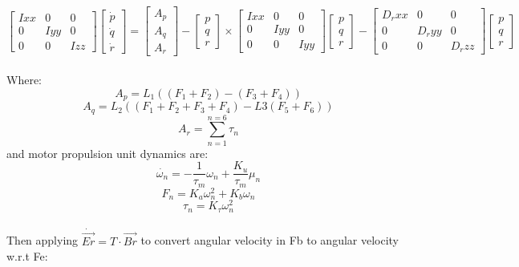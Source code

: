 \documentclass[12pt,a4paper,twoside]{report}
\begin{document}
			$$ 
				\begin{bmatrix}
				Ixx & 0 & 0 \\
				0 & Iyy & 0 \\
				0 & 0 & Izz
				\end{bmatrix}
				\begin{bmatrix}
				\dot{p} \\
				\dot{q} \\
				\dot{r}
				\end{bmatrix}
				=
				\begin{bmatrix}
				A_p \\
				A_q \\
				A_r
				\end{bmatrix}
				-
				\begin{bmatrix}
				p \\
				q \\
				r 
				\end{bmatrix}
				\times
				\begin{bmatrix}
				Ixx & 0 & 0 \\
				0 & Iyy & 0 \\
				0 & 0 & Iyy
				\end{bmatrix}
				\begin{bmatrix}
				p \\
				q \\
				r 
				\end{bmatrix}
				-
				\begin{bmatrix}
				D_rxx & 0 & 0 \\
				0 & D_ryy & 0 \\
				0 & 0 & D_rzz
				\end{bmatrix}
				\begin{bmatrix}
				p \\
				q \\
				r
				\end{bmatrix}
			$$ 
			\\
			Where:
				\[ A_p = L_1 ((F_1+F_2) - (F_3+F_4)) \]
				\[ A_q = L_2 ((F_1+F_2+F_3+F_4) - L3 (F_5+F_6)) \]
				\[ A_r = \sum_{n = 1}^{n = 6}\tau_n \]
			and motor propulsion unit dynamics are:
				\[\dot{\omega_n} = -\frac{1}{\tau_m}\omega_n	 + \frac{K_u}{\tau_m}\mu_n\]
				\[ F_n = K_a \omega_n^2 + K_b\omega_n \]
				\[\tau_n = K_\tau \omega_n^2 \]
			\\
			Then applying \(\dot{\vec{Er}} = T \cdot \vec{Br} \) to convert angular velocity in Fb to angular velocity w.r.t Fe:
			\\
\end{document}
